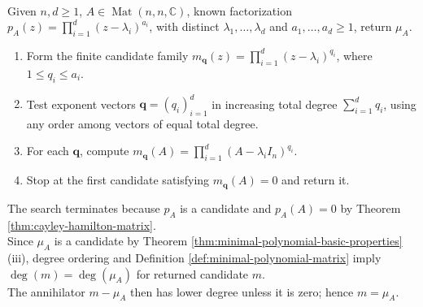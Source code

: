 \begin{computationmethod} \label{meth:minimal-polynomial-testing-from-characteristic-polynomial} \\
Given $n,d\geq1$, $A\in\operatorname{Mat}(n,n,\mathbb{C})$, known factorization $p_A(z)=\prod\limits_{i=1}^{d}(z-\lambda_i)^{a_i}$, with distinct $\lambda_1,\ldots,\lambda_d$ and $a_1,\ldots,a_d\geq1$, return $\mu_A$.
\begin{enumerate}[label=\roman*.]
\setlength{\itemsep}{0pt}
\item Form the finite candidate family $m_{\mathbf{q}}(z)=\prod\limits_{i=1}^{d}(z-\lambda_i)^{q_i}$, where $1\leq q_i\leq a_i$.
\item Test exponent vectors $\mathbf{q}=(q_i)_{i=1}^{d}$ in increasing total degree $\sum\limits_{i=1}^{d}q_i$, using any order among vectors of equal total degree.
\item For each $\mathbf{q}$, compute $m_{\mathbf{q}}(A)=\prod_{i=1}^{d}(A-\lambda_iI_n)^{q_i}$.
\item Stop at the first candidate satisfying $m_{\mathbf{q}}(A)=0$ and return it.
\end{enumerate}
The search terminates because $p_A$ is a candidate and $p_A(A)=0$ by Theorem \ref{thm:cayley-hamilton-matrix}.\\
Since $\mu_A$ is a candidate by Theorem \ref{thm:minimal-polynomial-basic-properties}(iii), degree ordering and Definition \ref{def:minimal-polynomial-matrix} imply $\deg(m)=\deg(\mu_A)$ for returned candidate $m$.\\
The annihilator $m-\mu_A$ then has lower degree unless it is zero; hence $m=\mu_A$.
\end{computationmethod}
